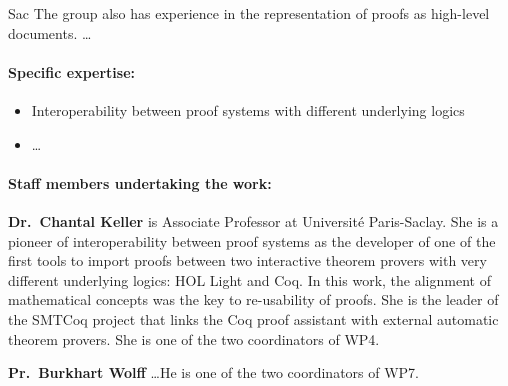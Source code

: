 \begin{sitedescription}{Sac}
The group also has experience in the representation of proofs as
high-level documents. \dots



\paragraph{Specific expertise:}

\begin{itemize}
\item Interoperability between proof systems with different underlying
  logics
\item \dots
\end{itemize}

\paragraph{Staff members undertaking the work:}

\textbf{Dr.\ Chantal Keller} is Associate Professor at Université
Paris-Saclay. She is a pioneer of interoperability between proof systems
as the developer of one of the first tools to import proofs between two
interactive theorem provers with very different underlying logics: HOL
Light and Coq. In this work, the alignment of mathematical concepts was
the key to re-usability of proofs. She is the leader of the SMTCoq
project that links the Coq proof assistant with external automatic
theorem provers. She is one of the two coordinators of WP4.

\textbf{Pr.\ Burkhart Wolff} \dots He is one of the two coordinators of WP7.

\end{sitedescription}


